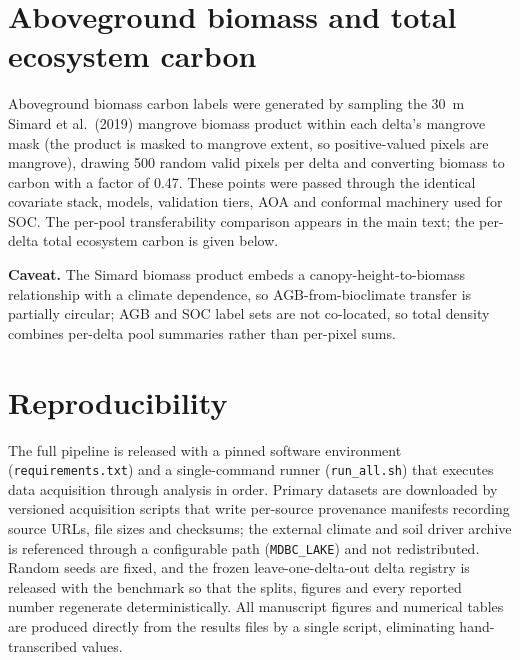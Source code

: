 \documentclass[10pt]{extarticle}
\begin{document}
\begin{table}[h]
\centering
\caption{Per-delta standardized slopes of SOC on four covariates (Ridge, deltas with
$n\geq30$). Sign reversals between deltas are direct evidence of concept shift.
Auto-generated from \texttt{concept\_shift.json}.}
\label{tab:conceptshift}

\end{table}

\section{Aboveground biomass and total ecosystem carbon}
Aboveground biomass carbon labels were generated by sampling the 30~m Simard et al.\
(2019) mangrove biomass product within each delta's mangrove mask (the product is masked
to mangrove extent, so positive-valued pixels are mangrove), drawing 500 random valid
pixels per delta and converting biomass to carbon with a factor of 0.47. These points
were passed through the identical covariate stack, models, validation tiers, AOA and
conformal machinery used for SOC. The per-pool transferability comparison appears in the main text; the per-delta
total ecosystem carbon is given below.

\begin{table}[h]
\centering
\caption{Total ecosystem carbon per core delta (mean AGB-C, median SOC, total density,
soil fraction, and delta stock). Auto-generated from \texttt{total\_carbon.json}.}

\end{table}

\noindent\textbf{Caveat.} The Simard biomass product embeds a canopy-height-to-biomass
relationship with a climate dependence, so AGB-from-bioclimate transfer is partially
circular; AGB and SOC label sets are not co-located, so total density combines per-delta
pool summaries rather than per-pixel sums.

\section{Reproducibility}
The full pipeline is released with a pinned software environment
(\texttt{requirements.txt}) and a single-command runner (\texttt{run\_all.sh}) that
executes data acquisition through analysis in order. Primary datasets are downloaded by
versioned acquisition scripts that write per-source provenance manifests recording source
URLs, file sizes and checksums; the external climate and soil driver archive is referenced
through a configurable path (\texttt{MDBC\_LAKE}) and not redistributed. Random seeds are
fixed, and the frozen leave-one-delta-out delta registry is released with the benchmark so
that the splits, figures and every reported number regenerate deterministically. All
manuscript figures and numerical tables are produced directly from the results files by a
single script, eliminating hand-transcribed values.
\end{document}
